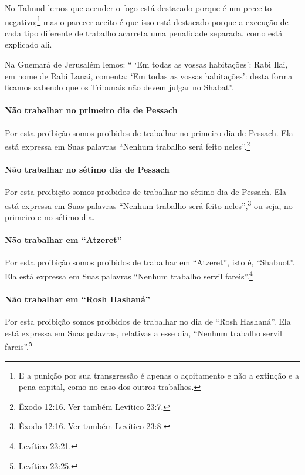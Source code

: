No Talmud lemos que acender o fogo está destacado porque é um preceito
negativo;\footnote{E a punição por sua transgressão é apenas o açoitamento e não a
  extinção e a pena capital, como no caso dos outros trabalhos.} mas o parecer aceito é que isso está
destacado porque a execução de cada tipo diferente de trabalho acarreta
uma penalidade separada, como está explicado ali.

Na Guemará de Jerusalém lemos: `` `Em todas as vossas habitações': Rabi
Ilai, em nome de Rabi Lanai, comenta: `Em todas as vossas habitações':
desta forma ficamos sabendo que os Tribunais não devem julgar no
Shabat''.

\paragraph{Não trabalhar no primeiro dia de Pessach}

Por esta proibição somos proibidos de trabalhar no primeiro dia de
Pessach. Ela está expressa em Suas palavras ``Nenhum trabalho será
feito neles''.\footnote{Êxodo 12:16. Ver também Levítico 23:7.}

\paragraph{Não trabalhar no sétimo dia de Pessach}

Por esta proibição somos proibidos de trabalhar no sétimo dia de
Pessach. Ela está expressa em Suas palavras ``Nenhum trabalho será
feito neles'',\footnote{Êxodo 12:16. Ver também Levítico 23:8.} ou seja, no primeiro e no sétimo dia.

\paragraph{Não trabalhar em ``Atzeret''}

Por esta proibição somos proibidos de trabalhar em ``Atzeret'', isto é,
``Shabuot''. Ela está expressa em Suas palavras ``Nenhum trabalho servil
fareis''.\footnote{Levítico 23:21.}

\paragraph{Não trabalhar em ``Rosh Hashaná''}

Por esta proibição somos proibidos de trabalhar no dia de ``Rosh
Hashaná''. Ela está expressa em Suas palavras, relativas a esse dia,
``Nenhum trabalho servil fareis''.\footnote{Levítico 23:25.}

